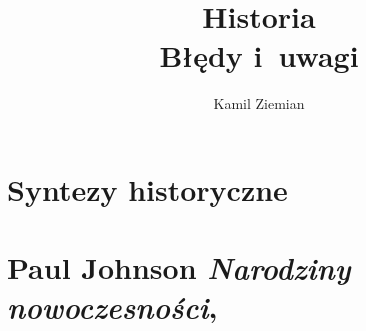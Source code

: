 \documentclass[a4paper,11pt]{article}
\title{Historia \\
  {\Large Błędy i~uwagi}}
\author{Kamil Ziemian}
\numberwithin{equation}{section}
\begin{document}





\maketitle





\section{Syntezy historyczne}

\VerSpaceTwo



\section{Paul Johnson \textit{Narodziny nowoczesności},
  \cite{JohnsonNarodzinyNowoczesnoci1995}}



\vspace{0em}



\vspace{0em}
\end{document}
